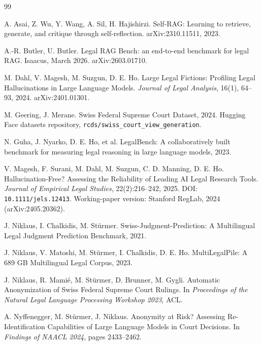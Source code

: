 \documentclass[11pt,a4paper]{article}
\begin{document}
\begin{thebibliography}{99}

A. Asai, Z. Wu, Y. Wang, A. Sil, H. Hajishirzi.
\newblock Self-RAG: Learning to retrieve, generate, and critique through self-reflection.
\newblock arXiv:2310.11511, 2023.

A.-R. Butler, U. Butler.
\newblock Legal RAG Bench: an end-to-end benchmark for legal RAG.
\newblock Isaacus, March 2026.  arXiv:2603.01710.

M. Dahl, V. Magesh, M. Suzgun, D. E. Ho.
\newblock Large Legal Fictions: Profiling Legal Hallucinations in Large Language Models.
\newblock \emph{Journal of Legal Analysis}, 16(1), 64--93, 2024.  arXiv:2401.01301.

M. Geering, J. Merane.
\newblock Swiss Federal Supreme Court Dataset, 2024.
\newblock Hugging Face datasets repository, \texttt{rcds/swiss\_court\_view\_generation}.

N. Guha, J. Nyarko, D. E. Ho, et al.
\newblock LegalBench: A collaboratively built benchmark for measuring legal reasoning in large language models, 2023.

V. Magesh, F. Surani, M. Dahl, M. Suzgun, C. D. Manning, D. E. Ho.
\newblock Hallucination-Free? Assessing the Reliability of Leading AI Legal Research Tools.
\newblock \emph{Journal of Empirical Legal Studies}, 22(2):216--242,
        2025.  DOI: \texttt{10.1111/jels.12413}.
        Working-paper version: Stanford RegLab, 2024 (arXiv:2405.20362).

J. Niklaus, I. Chalkidis, M. Stürmer.
\newblock Swiss-Judgment-Prediction: A Multilingual Legal Judgment Prediction Benchmark, 2021.

J. Niklaus, V. Matoshi, M. Stürmer, I. Chalkidis, D. E. Ho.
\newblock MultiLegalPile: A 689 GB Multilingual Legal Corpus, 2023.

J. Niklaus, R. Mami{\'e}, M. St{\"u}rmer, D. Brunner, M. Gygli.
\newblock Automatic Anonymization of Swiss Federal Supreme Court Rulings.
\newblock In \emph{Proceedings of the Natural Legal Language Processing Workshop 2023}, ACL.

A. Nyffenegger, M. St{\"u}rmer, J. Niklaus.
\newblock Anonymity at Risk?  Assessing Re-Identification Capabilities of Large Language Models in Court Decisions.
\newblock In \emph{Findings of NAACL 2024}, pages 2433--2462.


\end{thebibliography}
\end{document}
